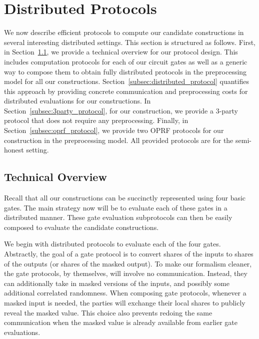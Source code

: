 \newpage
\section{Distributed Protocols}
\label{sec:distributed_protocols}
We now describe efficient protocols to compute our candidate constructions in several interesting distributed settings. This section is structured as follows. First, in Section~\ref{subsec:protocol_overview}, we provide a technical overview for our protocol design. This includes computation protocols for each of our circuit gates as well as a generic way to compose them to obtain fully distributed protocols in the preprocessing model for all our constructions. Section~\ref{subsec:distributed_protocol} quantifies this approach by providing concrete communication and preprocessing costs for distributed evaluations for our constructions. In Section~\ref{subsec:3party_protocol}, for our \ttwPRF construction, we provide a 3-party protocol that does not require any preprocessing. Finally, in Section~\ref{subsec:oprf_protocol}, we provide two OPRF protocols for our \ttwPRF construction in the preprocessing model. All provided protocols are for the semi-honest setting.


\subsection{Technical Overview}
\label{subsec:protocol_overview}
Recall that all our constructions can be succinctly represented using four basic gates. The main strategy now will be to evaluate each of these gates in a distributed manner. These gate evaluation subprotocols can then be easily composed to evaluate the  candidate constructions. 


We begin with distributed protocols to evaluate each of the four gates. Abstractly, the goal of a gate protocol is to convert shares of the inputs to shares of the outputs (or shares of the masked output). To make our formalism cleaner, the gate protocols, by themselves, will involve no communication. Instead, they can additionally take in masked versions of the inputs, and possibly some additional correlated randomness. When composing gate protocols, whenever a masked input is needed, the parties will exchange their local shares to publicly reveal the masked value. This choice also prevents redoing the same communication when the masked value is already available from earlier gate evaluations.


